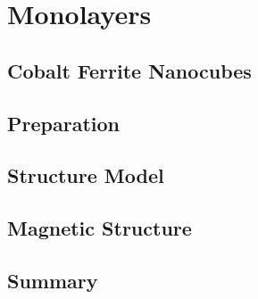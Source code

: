 \documentclass[\main/dresen_thesis.tex]{subfiles}
\renewcommand{\thisPath}{\main/chapters/monolayers}
\begin{document}
  \chapter{Monolayers}\label{ch:monolayers}
    

    \section{Cobalt Ferrite Nanocubes}
      

    \FloatBarrier
    \clearpage
    \section{Preparation}
      

    \FloatBarrier
    \clearpage
    \section{Structure Model}
      

    \FloatBarrier
    \section{Magnetic Structure}
      

    \FloatBarrier
    \section{Summary}
      
\end{document}
